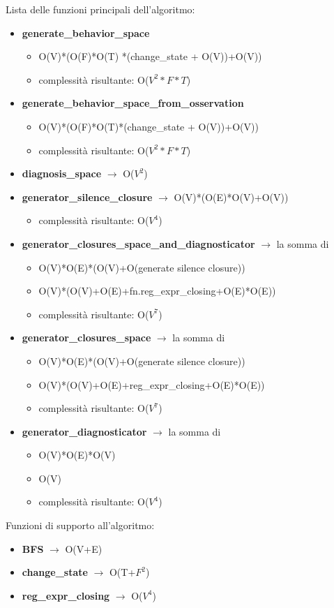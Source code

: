 Lista delle funzioni principali dell'algoritmo:
\begin{itemize}
    \item \textbf{generate\_behavior\_space}
    \begin{itemize}
        \item O(V)*(O(F)*O(T) *(change\_state + O(V))+O(V))
        \item complessità risultante: O($V^2*F*T$)
    \end{itemize}
    \item \textbf{generate\_behavior\_space\_from\_osservation} 
    \begin{itemize}
        \item O(V)*(O(F)*O(T)*(change\_state + O(V))+O(V))
        \item complessità risultante: O($V^2*F*T$)
    \end{itemize}
    \item \textbf{diagnosis\_space}  $\rightarrow$ O($V^2$)
    \item \textbf{generator\_silence\_closure} $\rightarrow$ O(V)*(O(E)*O(V)+O(V))
    \begin{itemize}
        \item complessità risultante: O($V^4$)
    \end{itemize}
    \item \textbf{generator\_closures\_space\_and\_diagnosticator} $\rightarrow$ la somma di 
    \begin{itemize}
        \item O(V)*O(E)*(O(V)+O(generate silence closure))
        \item O(V)*(O(V)+O(E)+fn.reg\_expr\_closing+O(E)*O(E))
        \item complessità risultante: O($V^7$)
    \end{itemize}
    \item \textbf{generator\_closures\_space} $\rightarrow$ la somma di
        \begin{itemize}
        \item O(V)*O(E)*(O(V)+O(generate silence closure))
        \item O(V)*(O(V)+O(E)+reg\_expr\_closing+O(E)*O(E))
        \item complessità risultante: O($V^7$)
    \end{itemize}
    \item \textbf{generator\_diagnosticator} $\rightarrow$ la somma di
        \begin{itemize}
        \item O(V)*O(E)*O(V)
        \item O(V)
        \item complessità risultante: O($V^4$)
    \end{itemize}
\end{itemize}
Funzioni di supporto all'algoritmo:
\begin{itemize}
    \item \textbf{BFS} $\rightarrow$  O(V+E)
    \item \textbf{change\_state} $\rightarrow$ O(T+$F^2$)
    \item \textbf{reg\_expr\_closing} $\rightarrow$ O($V^4$)
\end{itemize}


